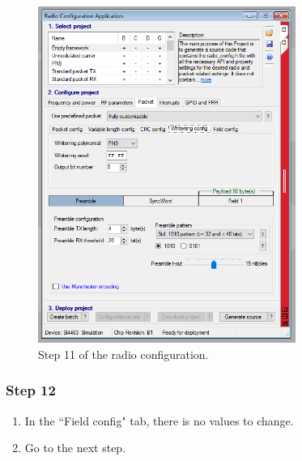 \begin{figure}[!h]
	\begin{center}
		\includegraphics[width=0.75\textwidth]{figures/wds-tutorial-11.png}
		\caption{Step 11 of the radio configuration.}
		\label{fig:wds-tutorial-step-11}
	\end{center}
\end{figure}

\subsubsection{Step 12}

\begin{enumerate}
    \item In the ``Field config" tab, there is no values to change.
    \item Go to the next step.
\end{enumerate}

